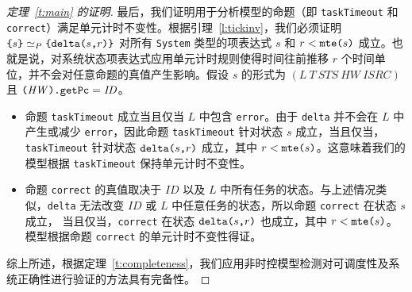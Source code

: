 \begin{proof}[定理~\ref{t:main} 的证明]
最后，我们证明用于分析模型的命题（即 \verb|taskTimeout| 和 \verb|correct|）满足单元计时不变性。根据引理~\ref{l:tickinv}，我们必须证明 $\verb|{|s\verb|}|\simeq_P\verb|{|\deltaS{s}{r}\verb|}|$ 对所有 \verb|System| 类型的项表达式 $s$ 和 $r<\texttt{mte(}s\texttt{)}$ 成立。也就是说，对系统状态项表达式应用单元计时规则使得时间往前推移 $r$ 个时间单位，并不会对任意命题的真值产生影响。假设 $s$ 的形式为 $(L~T~\mathit{STS}~\mathit{HW}~\mathit{ISRC})$ 且 $\verb|(|\mathit{HW}\verb|).getPc|=\mathit{ID}$。
\begin{itemize}
\item 
命题 \verb|taskTimeout| 成立当且仅当 $L$ 中包含 \verb|error|。由于 \verb|delta| 并不会在 $L$ 中产生或减少 \verb|error|，因此命题 \verb|taskTimeout| 针对状态 $s$ 成立，当且仅当，\verb|taskTimeout| 针对状态 $\texttt{delta(}s\texttt{,}r\texttt{)}$ 成立，其中 $r<\texttt{mte(}s\texttt{)}$。这意味着我们的模型根据 \verb|taskTimeout| 保持单元计时不变性。
\item 
命题 \verb|correct| 的真值取决于 $\mathit{ID}$ 以及 $L$ 中所有任务的状态。与上述情况类似，\verb|delta| 无法改变 $\mathit{ID}$ 或 $L$ 中任意任务的状态，所以命题 \verb|correct| 在状态 $s$ 成立， 当且仅当，\verb|correct| 在状态 $\texttt{delta(}s\texttt{,}r\texttt{)}$ 也成立，其中 $r<\texttt{mte(}s\texttt{)}$。模型根据命题 \verb|correct| 的单元计时不变性得证。
\end{itemize}

综上所述，根据定理~\ref{t:completeness}，我们应用非时控模型检测对可调度性及系统正确性进行验证的方法具有完备性。
\end{proof}
